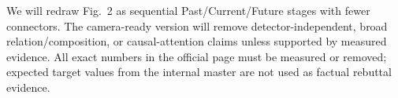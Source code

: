 \documentclass{article}
\begin{document}
\vspace{2pt}
We will redraw Fig.~2 as sequential Past/Current/Future stages with fewer connectors. The camera-ready version will remove detector-independent, broad relation/composition, or causal-attention claims unless supported by measured evidence. All exact numbers in the official page must be measured or removed; expected target values from the internal master are not used as factual rebuttal evidence.
\end{document}
